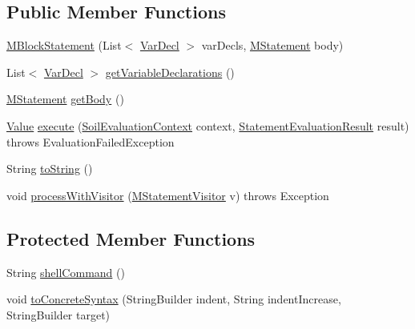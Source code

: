 \subsection*{Public Member Functions}
\begin{DoxyCompactItemize}
\item 
\hyperlink{classorg_1_1tzi_1_1use_1_1uml_1_1sys_1_1soil_1_1_m_block_statement_ae08994b343b17a837eafe6802467ce6c}{M\-Block\-Statement} (List$<$ \hyperlink{classorg_1_1tzi_1_1use_1_1uml_1_1ocl_1_1expr_1_1_var_decl}{Var\-Decl} $>$ var\-Decls, \hyperlink{classorg_1_1tzi_1_1use_1_1uml_1_1sys_1_1soil_1_1_m_statement}{M\-Statement} body)
\item 
List$<$ \hyperlink{classorg_1_1tzi_1_1use_1_1uml_1_1ocl_1_1expr_1_1_var_decl}{Var\-Decl} $>$ \hyperlink{classorg_1_1tzi_1_1use_1_1uml_1_1sys_1_1soil_1_1_m_block_statement_afe604d7c719097be350d165e4a0acbec}{get\-Variable\-Declarations} ()
\item 
\hyperlink{classorg_1_1tzi_1_1use_1_1uml_1_1sys_1_1soil_1_1_m_statement}{M\-Statement} \hyperlink{classorg_1_1tzi_1_1use_1_1uml_1_1sys_1_1soil_1_1_m_block_statement_aff250b4495e7637222288e31cedbfc06}{get\-Body} ()
\item 
\hyperlink{classorg_1_1tzi_1_1use_1_1uml_1_1ocl_1_1value_1_1_value}{Value} \hyperlink{classorg_1_1tzi_1_1use_1_1uml_1_1sys_1_1soil_1_1_m_block_statement_ad2a6253297bdee9737f4413a77004f17}{execute} (\hyperlink{classorg_1_1tzi_1_1use_1_1uml_1_1sys_1_1soil_1_1_soil_evaluation_context}{Soil\-Evaluation\-Context} context, \hyperlink{classorg_1_1tzi_1_1use_1_1uml_1_1sys_1_1_statement_evaluation_result}{Statement\-Evaluation\-Result} result)  throws Evaluation\-Failed\-Exception 
\item 
String \hyperlink{classorg_1_1tzi_1_1use_1_1uml_1_1sys_1_1soil_1_1_m_block_statement_a83afdf479b4b46dd9a39e506361235e5}{to\-String} ()
\item 
void \hyperlink{classorg_1_1tzi_1_1use_1_1uml_1_1sys_1_1soil_1_1_m_block_statement_a052cdd9790a5b688c2117898f2babb8e}{process\-With\-Visitor} (\hyperlink{interfaceorg_1_1tzi_1_1use_1_1uml_1_1sys_1_1soil_1_1_m_statement_visitor}{M\-Statement\-Visitor} v)  throws Exception 
\end{DoxyCompactItemize}
\subsection*{Protected Member Functions}
\begin{DoxyCompactItemize}
\item 
String \hyperlink{classorg_1_1tzi_1_1use_1_1uml_1_1sys_1_1soil_1_1_m_block_statement_a9de3b943c5d0411724a4cc71b77491e6}{shell\-Command} ()
\item 
void \hyperlink{classorg_1_1tzi_1_1use_1_1uml_1_1sys_1_1soil_1_1_m_block_statement_a0f81a7c37f3078b836d59021c4cf55a8}{to\-Concrete\-Syntax} (String\-Builder indent, String indent\-Increase, String\-Builder target)
\end{DoxyCompactItemize}


